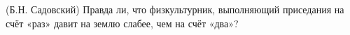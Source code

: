 (Б.Н. Садовский)
Правда ли, что физкультурник, выполняющий приседания на счёт «раз» давит
на землю слабее, чем на счёт «два»?
